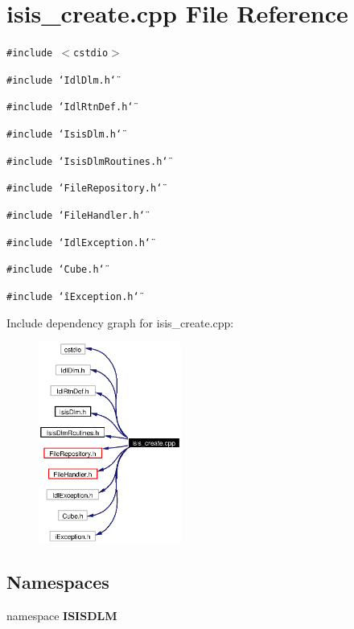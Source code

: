 \section{isis\_\-create.cpp File Reference}
\label{isis__create_8cpp}
{\tt \#include $<$cstdio$>$}\par
{\tt \#include \char`\"{}Idl\-Dlm.h\char`\"{}}\par
{\tt \#include \char`\"{}Idl\-Rtn\-Def.h\char`\"{}}\par
{\tt \#include \char`\"{}Isis\-Dlm.h\char`\"{}}\par
{\tt \#include \char`\"{}Isis\-Dlm\-Routines.h\char`\"{}}\par
{\tt \#include \char`\"{}File\-Repository.h\char`\"{}}\par
{\tt \#include \char`\"{}File\-Handler.h\char`\"{}}\par
{\tt \#include \char`\"{}Idl\-Exception.h\char`\"{}}\par
{\tt \#include \char`\"{}Cube.h\char`\"{}}\par
{\tt \#include \char`\"{}i\-Exception.h\char`\"{}}\par


Include dependency graph for isis\_\-create.cpp:\begin{figure}[H]
\begin{center}
\leavevmode
\includegraphics[width=133pt]{isis__create_8cpp__incl}
\end{center}
\end{figure}
\subsection*{Namespaces}
\begin{CompactItemize}
\item 
namespace {\bf ISISDLM}
\end{CompactItemize}
